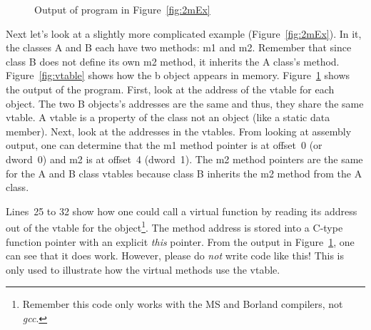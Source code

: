 \begin{figure}[tp]
\caption{Output of program in Figure~\ref{fig:2mEx} \label{fig:2mExOut}}
\end{figure}


Next let's look at a slightly more complicated example
(Figure~\ref{fig:2mEx}). In it, the classes {\code A} and {\code B}
each have two methods: {\code m1} and {\code m2}. Remember that since
class {\code B} does not define its own {\code m2} method, it
inherits the {\code A} class's method.  Figure~\ref{fig:vtable} shows
how the {\code b} object appears in memory. Figure~\ref{fig:2mExOut}
shows the output of the program. First, look at the address of the
vtable for each object.  The two {\code B} objects's addresses are the
same and thus, they share the same vtable.  A vtable is a property of
the class not an object (like a {\code static} data member). Next,
look at the addresses in the vtables. From looking at assembly output,
one can determine that the {\code m1} method pointer is at offset~0
(or dword~0) and {\code m2} is at offset~4 (dword~1). The {\code m2}
method pointers are the same for the {\code A} and {\code B} class
vtables because class {\code B} inherits the {\code m2} method from
the {\code A} class.

Lines~25 to 32 show how one could call a virtual function by reading
its address out of the vtable for the object\footnote{Remember this
code only works with the MS and Borland compilers, not \emph{gcc}.}.
The method address is stored into a C-type function pointer with an
explicit \emph{this} pointer.  From the output in
Figure~\ref{fig:2mExOut}, one can see that it does work. However,
please do \emph{not} write code like this! This is only used to
illustrate how the virtual methods use the vtable.

